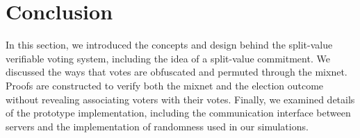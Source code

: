 \section{Conclusion}

In this section, we introduced the concepts and design behind the split-value verifiable voting system, including the idea of a split-value commitment. We discussed the ways that votes are obfuscated and permuted through the mixnet. Proofs are constructed to verify both the mixnet and the election outcome without revealing associating voters with their votes. Finally, we examined details of the prototype implementation, including the communication interface between servers and the implementation of randomness used in our simulations.

